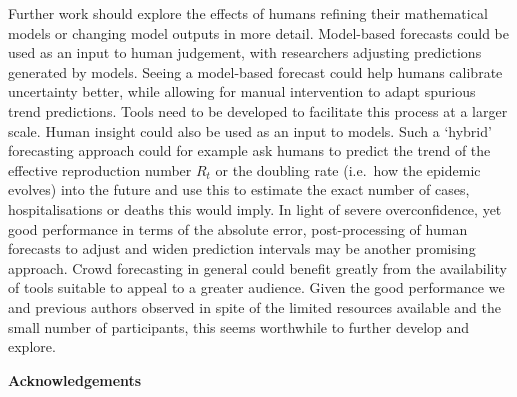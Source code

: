 \documentclass[10pt,letterpaper]{article} %
\begin{document}
Further work should explore the effects of humans refining their
mathematical models or changing model outputs in more detail.
Model-based forecasts could be used as an input to human judgement, with
researchers adjusting predictions generated by models. Seeing a
model-based forecast could help humans calibrate uncertainty better,
while allowing for manual intervention to adapt spurious trend
predictions. Tools need to be developed to facilitate this process at a
larger scale. Human insight could also be used as an input to models.
Such a `hybrid' forecasting approach could for example ask humans to
predict the trend of the effective reproduction number \(R_t\) or the
doubling rate (i.e.~how the epidemic evolves) into the future and use
this to estimate the exact number of cases, hospitalisations or deaths
this would imply. In light of severe overconfidence, yet good
performance in terms of the absolute error, post-processing of human
forecasts to adjust and widen prediction intervals may be another
promising approach. Crowd forecasting in general could benefit greatly
from the availability of tools suitable to appeal to a greater audience.
Given the good performance we and previous authors observed in spite of
the limited resources available and the small number of participants,
this seems worthwhile to further develop and explore.

\clearpage

\textbf{Acknowledgements}
\end{document}
